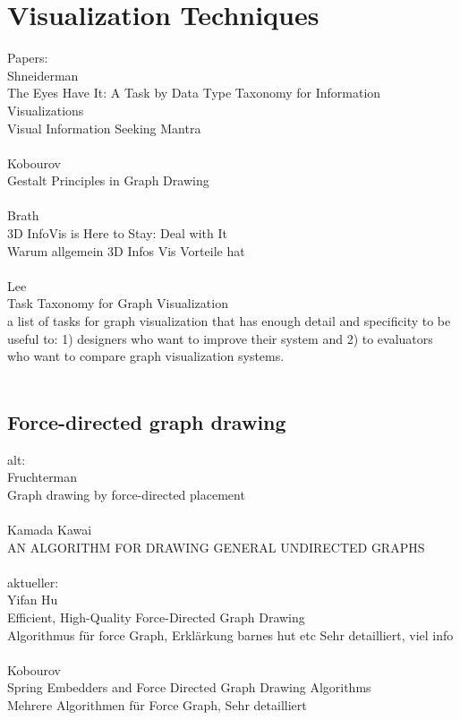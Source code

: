 \section{Visualization Techniques}
Papers:\\

Shneiderman\\
The Eyes Have It: A Task by Data Type Taxonomy for Information Visualizations\\
Visual Information Seeking Mantra\\
\\
Kobourov\\
Gestalt Principles in Graph Drawing\\
\\
Brath \\
3D InfoVis is Here to Stay: Deal with It\\
Warum allgemein 3D Infos Vis Vorteile hat\\
\\
Lee\\
Task Taxonomy for Graph Visualization\\
a list of tasks for graph visualization that has
enough detail and specificity to be useful to: 1) designers who
want to improve their system and 2) to evaluators who want to
compare graph visualization systems.\\
\\

\subsection{Force-directed graph drawing}
alt:\\
Fruchterman\\
Graph drawing by force-directed placement\\
\\
Kamada Kawai\\
AN ALGORITHM FOR DRAWING GENERAL UNDIRECTED GRAPHS\\
\\

aktueller:\\
Yifan Hu\\
Efficient, High-Quality Force-Directed Graph Drawing\\
Algorithmus für force Graph,  Erklärkung barnes hut etc Sehr detailliert, viel info\\
\\
Kobourov\\
Spring Embedders and Force Directed Graph Drawing Algorithms\\
Mehrere Algorithmen für Force Graph, Sehr detailliert\\
\\

